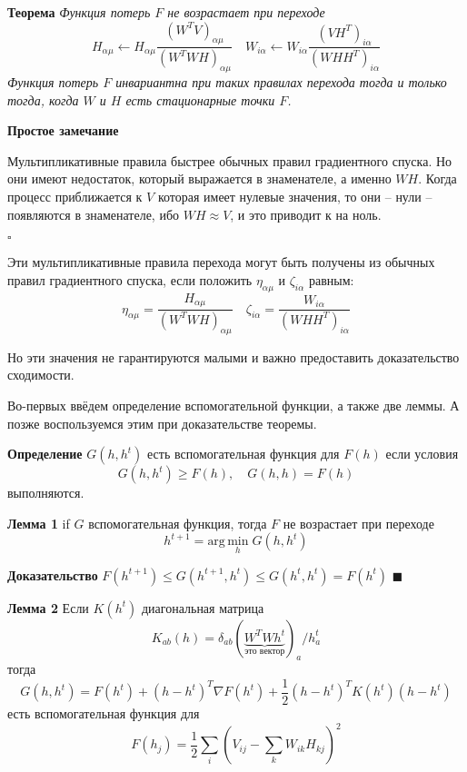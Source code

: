 \documentclass[oneside, final, 14pt]{extarticle}
\begin{document}
\textbf{Теорема} \textit{ Функция потерь $F$ не возрастает
при переходе
\[
  H_{\alpha\mu} \leftarrow H_{\alpha\mu}
  \frac{(W^TV)_{\alpha\mu}}{(W^TWH)_{\alpha\mu}} \quad
  W_{i\alpha} \leftarrow W_{i\alpha}
  \frac{(VH^T)_{i\alpha}}{(WHH^T)_{i\alpha}}
\]
Функция потерь $F$ инвариантна при таких правилах перехода тогда
и только тогда, когда $W$ и $H$ есть стационарные точки $F$.
}

\textbf{Простое замечание}

Мультипликативные правила быстрее обычных правил градиентного
спуска. Но они имеют недостаток, который выражается в знаменателе,
а именно $WH$. Когда процесс приближается к $V$ которая имеет нулевые
значения, то они -- нули -- появляются в знаменателе, ибо
$WH \approx V$, и это приводит
к { на ноль}.

$\square$

Эти мультипликативные правила перехода могут быть получены из
обычных правил градиентного спуска, если положить
$\eta_{\alpha\mu}$ и $\zeta_{i\alpha}$ равным:
\[
  \eta_{\alpha\mu} =
  \frac {H_{\alpha\mu}}
        {(W^TWH)_{\alpha\mu}} \quad
  \zeta_{i\alpha} =
  \frac {W_{i\alpha}}
        {(WHH^T)_{i\alpha}}
\]

Но эти значения не гарантируются малыми и важно предоставить
доказательство сходимости.

Во-первых ввёдем определение вспомогательной функции, а также две леммы.
А позже воспользуемся этим при доказательстве теоремы.

\textbf{Определение} $G(h,h^t)$ есть вспомогательная функция для $F(h)$
если условия
\[
  G(h,h^t) \geqslant F(h), \quad G(h,h) = F(h)
\]
выполняются.

\textbf{Лемма 1} if $G$ вспомогательная функция,
тогда $F$ не возрастает при переходе
\[
  h^{t+1} = \text{arg} \, \underset{h}{\text{min}} \; G(h,h^t)
\]

\textbf{Доказательство}
$F(h^{t+1}) \leqslant G(h^{t+1},h^t) \leqslant G(h^t,h^t) = F(h^t)$
$\blacksquare$

\textbf{Лемма 2} Если $K(h^t)$ диагональная матрица
\[
  K_{ab}(h) =
  \delta_{ab}
  (\underbrace{W^T W h^t}
    _{\text{это вектор}}
  )_a / h_a^t
\]
тогда
\begin{equation}\label{E:auxghht}
  G(h,h^t) = F(h^t) + (h - h^t)^T \nabla F(h^t)
    + \frac{1}{2} (h - h^t)^T K(h^t) (h - h^t)
\end{equation}
есть вспомогательная функция для
\[
  F(h_j) = \frac{1}{2} \sum_{i}
  \left(
    V_{ij} - \sum_{k}W_{ik}H_{kj}
  \right)^2
\]
\end{document}
